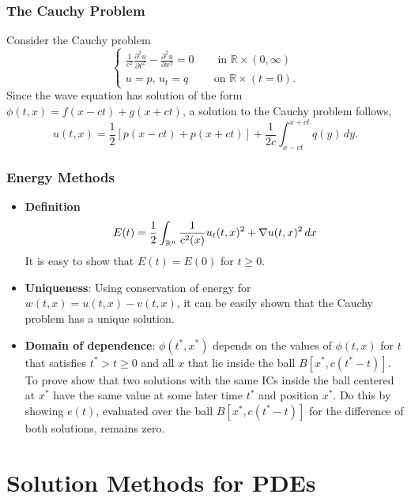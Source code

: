 \documentclass[oneside,a4paper,11pt]{report}
\begin{document}
\subsection{The Cauchy Problem}
Consider the Cauchy problem
\[ \begin{cases}
\frac{1}{c^2} \frac{\partial^2 u}{\partial t^2} - \frac{\partial^2 u}{\partial x^2} = 0 \quad & \text{ in } \mathbb{R} \times (0,\infty) \\
u = p, \, u_t = q & \text{on } \mathbb{R} \times (t=0).
\end{cases} \]
Since the wave equation has solution of the form $\phi(t,x) = f(x-ct) + g(x+ct)$, a solution to the Cauchy problem follows,
\[u(t,x) = \frac{1}{2}[p(x-ct) + p(x+ct)] + \frac{1}{2c} \int_{x-ct}^{x+ct} q(y) \, dy.\]

\subsection{Energy Methods}
\begin{itemize}

\item \textbf{Definition}
\[E(t) = \frac{1}{2} \int_{{\mathbb{R}^n}} \frac{1}{c^2(x)} u_t(t,x)^2 + \nabla u(t,x)^2 \, dx \]
 It is easy to show that $E(t) = E(0)$ for $t\ge0$.
 
\item \textbf{Uniqueness}: Using conservation of energy for $w(t,x) = u(t,x) - v(t,x)$, it can be easily shown that the Cauchy problem has a unique solution.
 
\item \textbf{Domain of dependence}: $\phi(t^*,x^*)$ depends on the values of $\phi(t,x)$ for $t$ that satisfies $t^*> t \ge 0$ and all $x$ that lie inside the ball $B[x^*, c(t^*-t)]$. To prove show that two solutions with the same ICs inside the ball centered at $x^*$ have the same value at some later time $t^*$ and position $x^*$. Do this by showing $e(t)$, evaluated over the ball $B[x^*,c(t^*-t)]$ for the difference of both solutions, remains zero.
 
\end{itemize} 

\chapter{Solution Methods for PDEs}
\end{document}
